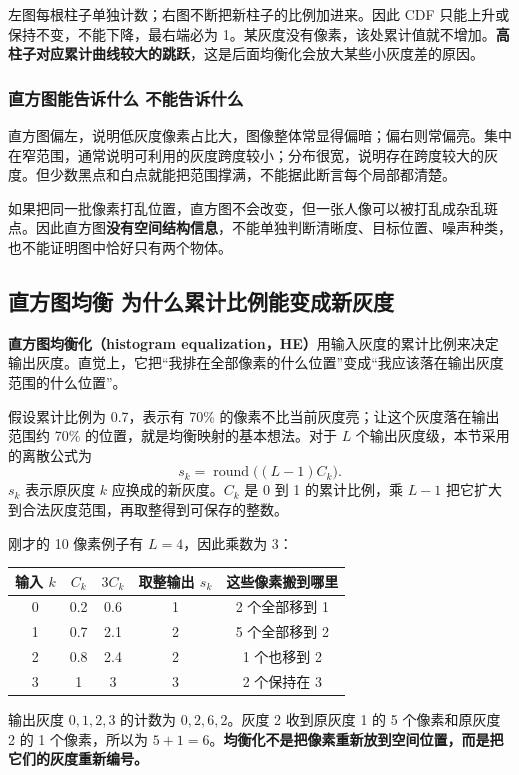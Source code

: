 左图每根柱子单独计数；右图不断把新柱子的比例加进来。因此 CDF 只能上升或保持不变，不能下降，最右端必为 1。某灰度没有像素，该处累计值就不增加。\textbf{高柱子对应累计曲线较大的跳跃}，这是后面均衡化会放大某些小灰度差的原因。

\subsubsection*{直方图能告诉什么 不能告诉什么}

直方图偏左，说明低灰度像素占比大，图像整体常显得偏暗；偏右则常偏亮。集中在窄范围，通常说明可利用的灰度跨度较小；分布很宽，说明存在跨度较大的灰度。但少数黑点和白点就能把范围撑满，不能据此断言每个局部都清楚。

如果把同一批像素打乱位置，直方图不会改变，但一张人像可以被打乱成杂乱斑点。因此直方图\textbf{没有空间结构信息}，不能单独判断清晰度、目标位置、噪声种类，也不能证明图中恰好只有两个物体。

\subsection{直方图均衡 为什么累计比例能变成新灰度}

\textbf{直方图均衡化（histogram equalization，HE）}用输入灰度的累计比例来决定输出灰度。直觉上，它把“我排在全部像素的什么位置”变成“我应该落在输出灰度范围的什么位置”。

假设累计比例为 0.7，表示有 70\% 的像素不比当前灰度亮；让这个灰度落在输出范围约 70\% 的位置，就是均衡映射的基本想法。对于 $L$ 个输出灰度级，本节采用的离散公式为
\[
s_k=\operatorname{round}\!\bigl((L-1)C_k\bigr).
\]
$s_k$ 表示原灰度 $k$ 应换成的新灰度。$C_k$ 是 0 到 1 的累计比例，乘 $L-1$ 把它扩大到合法灰度范围，再取整得到可保存的整数。

刚才的 10 像素例子有 $L=4$，因此乘数为 3：
\begin{center}
\begin{tabular}{ccccc}
\toprule
输入 $k$ & $C_k$ & $3C_k$ & 取整输出 $s_k$ & 这些像素搬到哪里\\
\midrule
0 & 0.2 & 0.6 & 1 & 2 个全部移到 1\\
1 & 0.7 & 2.1 & 2 & 5 个全部移到 2\\
2 & 0.8 & 2.4 & 2 & 1 个也移到 2\\
3 & 1 & 3 & 3 & 2 个保持在 3\\
\bottomrule
\end{tabular}
\end{center}
输出灰度 $0,1,2,3$ 的计数为 $0,2,6,2$。灰度 2 收到原灰度 1 的 5 个像素和原灰度 2 的 1 个像素，所以为 $5+1=6$。\textbf{均衡化不是把像素重新放到空间位置，而是把它们的灰度重新编号。}

